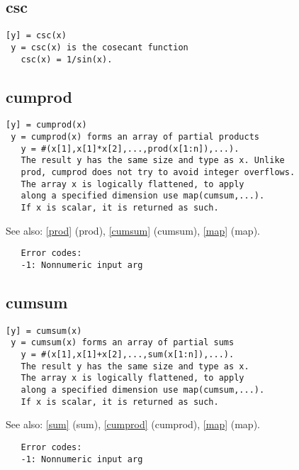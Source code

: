 \documentclass[a4paper]{article}
\begin{document}
\subsection{csc\label{csc}}

\begin{tscreen}
\begin{verbatim}
[y] = csc(x)
 y = csc(x) is the cosecant function
   csc(x) = 1/sin(x). 
\end{verbatim}
\end{tscreen}



\subsection{cumprod\label{cumprod}}

\begin{tscreen}
\begin{verbatim}
[y] = cumprod(x)
 y = cumprod(x) forms an array of partial products
   y = #(x[1],x[1]*x[2],...,prod(x[1:n]),...).
   The result y has the same size and type as x. Unlike
   prod, cumprod does not try to avoid integer overflows.
   The array x is logically flattened, to apply
   along a specified dimension use map(cumsum,...).
   If x is scalar, it is returned as such.
\end{verbatim}

See also: \ref{prod} {(prod)}, \ref{cumsum} {(cumsum)}, \ref{map} {(map)}.
\begin{verbatim}
   Error codes:
   -1: Nonnumeric input arg 
\end{verbatim}
\end{tscreen}



\subsection{cumsum\label{cumsum}}

\begin{tscreen}
\begin{verbatim}
[y] = cumsum(x)
 y = cumsum(x) forms an array of partial sums
   y = #(x[1],x[1]+x[2],...,sum(x[1:n]),...).
   The result y has the same size and type as x.
   The array x is logically flattened, to apply
   along a specified dimension use map(cumsum,...).
   If x is scalar, it is returned as such.
\end{verbatim}

See also: \ref{sum} {(sum)}, \ref{cumprod} {(cumprod)}, \ref{map} {(map)}.
\begin{verbatim}
   Error codes:
   -1: Nonnumeric input arg 
\end{verbatim}
\end{tscreen}
\end{document}
